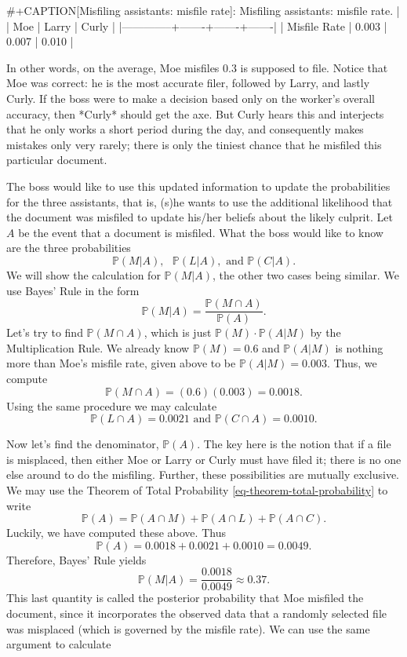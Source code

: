 #+CAPTION[Misfiling assistants: misfile rate]: Misfiling assistants: misfile rate.
|              |   Moe | Larry | Curly |
|--------------+-------+-------+-------|
| Misfile Rate | 0.003 | 0.007 | 0.010 |

In other words, on the average, Moe misfiles 0.3%
is supposed to file. Notice that Moe was correct: he is the most
accurate filer, followed by Larry, and lastly Curly. If the boss were
to make a decision based only on the worker's overall accuracy,
then *Curly* should get the axe. But Curly hears this and interjects
that he only works a short period during the day, and consequently
makes mistakes only very rarely; there is only the tiniest chance that
he misfiled this particular document.

The boss would like to use this updated information to update the
probabilities for the three assistants, that is, (s)he wants to use
the additional likelihood that the document was misfiled to update
his/her beliefs about the likely culprit. Let \(A\) be the event that
a document is misfiled. What the boss would like to know are the three
probabilities
\[
\mathbb{P}(M|A),\mbox{ }\mathbb{P}(L|A),\mbox{ and }\mathbb{P}(C|A).
\]
We will show the calculation for \(\mathbb{P}(M|A)\), the other two
cases being similar. We use Bayes' Rule in the form
\[
\mathbb{P}(M|A)=\frac{\mathbb{P}(M\cap A)}{\mathbb{P}(A)}.
\]
Let's try to find \(\mathbb{P}(M\cap A)\), which is just
\(\mathbb{P}(M)\cdot\mathbb{P}(A|M)\) by the Multiplication Rule. We
already know \(\mathbb{P}(M)=0.6\) and \(\mathbb{P}(A|M)\) is nothing
more than Moe's misfile rate, given above to be
\(\mathbb{P}(A|M)=0.003\). Thus, we compute
\[
\mathbb{P}(M\cap A)=(0.6)(0.003)=0.0018.
\]
Using the same procedure we may calculate
\[
\mathbb{P}(L \cap A)=0.0021\mbox{ and }\mathbb{P}(C \cap A)=0.0010.
\]

Now let's find the denominator, \(\mathbb{P}(A)\). The key here is the
notion that if a file is misplaced, then either Moe or Larry or Curly
must have filed it; there is no one else around to do the
misfiling. Further, these possibilities are mutually exclusive. We may
use the Theorem of Total Probability
\eqref{eq-theorem-total-probability} to write \[
\mathbb{P}(A)=\mathbb{P}(A\cap M)+\mathbb{P}(A\cap L)+\mathbb{P}(A\cap
C).  \] Luckily, we have computed these above. Thus \[
\mathbb{P}(A)=0.0018+0.0021+0.0010=0.0049.  \] Therefore, Bayes' Rule
yields \[ \mathbb{P}(M|A)=\frac{0.0018}{0.0049}\approx0.37.  \] This
last quantity is called the posterior probability that Moe misfiled
the document, since it incorporates the observed data that a randomly
selected file was misplaced (which is governed by the misfile
rate). We can use the same argument to calculate

